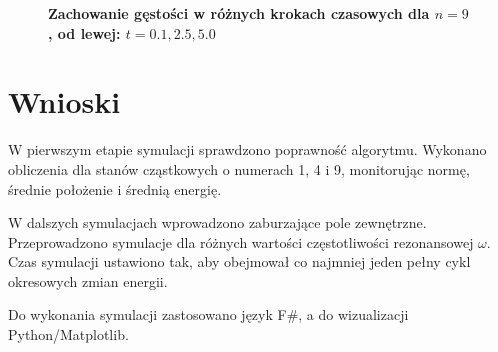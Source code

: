 \documentclass[11pt,a4paper]{article}
\begin{document}
\begin{figure}[ht!]
\begin{multicols}{3}
    \end{multicols}
    \caption{\textbf{Zachowanie gęstości w różnych krokach czasowych dla $n=9$, od lewej: $t=0.1,2.5,5.0$}}
\end{figure}
\clearpage

\section{Wnioski}

W pierwszym etapie symulacji sprawdzono poprawność algorytmu. Wykonano obliczenia dla stanów cząstkowych o numerach 1, 4 i 9, monitorując normę, średnie położenie i średnią energię.

W dalszych symulacjach wprowadzono zaburzające pole zewnętrzne. Przeprowadzono symulacje dla różnych wartości częstotliwości rezonansowej $\omega$. Czas symulacji ustawiono tak, aby obejmował co najmniej jeden pełny cykl okresowych zmian energii.

Do wykonania symulacji zastosowano język F\#, a do wizualizacji Python/Matplotlib.
\end{document}

